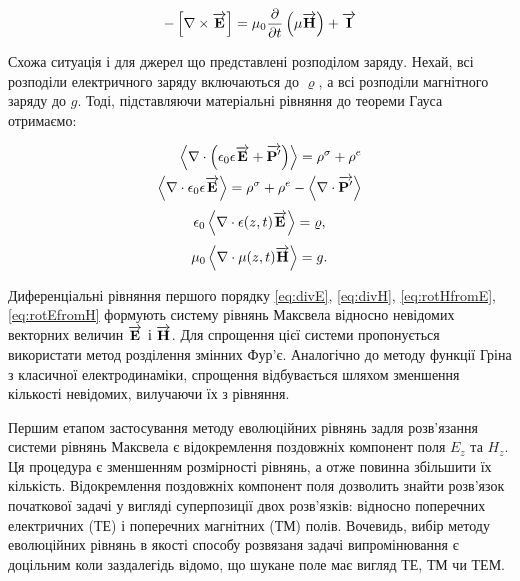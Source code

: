 \begin{equation} \label{eq:rotEfromH} 
- \left[ \nabla \times \overrightarrow{\mathbf E} \right] = 
\mu_0 \frac{\partial }{\partial t} \left( \mu \overrightarrow{\mathbf H} \right) + \overrightarrow{\mathbf I}
\end{equation}

Схожа ситуація і для джерел що представлені розподілом заряду. Нехай,
всі розподіли електричного заряду включаються до $ \varrho $, а всі розподіли 
магнітного заряду до $ g $. Тоді, підставляючи матеріальні рівняння до теореми 
Гауса отримаємо:

\textcolor{blue}{ \begin{equation*} \begin{aligned}
\left< \nabla \cdot  \left( \epsilon_0 \epsilon \overrightarrow{\mathbf E} + 
\overrightarrow{\mathbf P^\prime} \right)  \right> = \rho^\sigma + \rho^e \\
\left< \nabla \cdot  \epsilon_0 \epsilon \overrightarrow{\mathbf E}  \right> = \rho^\sigma + \rho^e -
\left< \nabla \cdot  \overrightarrow{\mathbf P^\prime}  \right>
\end{aligned} \end{equation*} }
%
\begin{equation} \label{eq:divE} 
\epsilon_0 \left< \nabla \cdot  \epsilon(z,t) \overrightarrow{\mathbf E}  \right> = \varrho,
\end{equation}
%
\begin{equation} \label{eq:divH}
\mu_0 \left< \nabla \cdot  \mu(z,t) \overrightarrow{\mathbf H}  \right> = g.
\end{equation}

Диференціальні рівняння першого порядку \eqref{eq:divE}, \eqref{eq:divH}, 
\eqref{eq:rotHfromE}, \eqref{eq:rotEfromH} формують систему 
рівнянь Максвела відносно невідомих векторних величин $ \overrightarrow{\mathbf E} $ і 
$ \overrightarrow{\mathbf H} $. Для спрощення цієї системи пропонується використати метод 
розділення змінних Фур'є. Аналогічно до методу функції Гріна з класичної 
електродинаміки, спрощення відбувається шляхом зменшення кількості невідомих,
вилучаючи їх з рівняння.

Першим етапом застосування методу еволюційних рівнянь задля розв'язання системи
рівнянь Максвела є відокремлення поздовжніх компонент поля $ E_z $ та $ H_z $.
Ця процедура є зменшенням розмірності рівнянь, а отже повинна збільшити їх 
кількість. Відокремлення поздовжніх компонент поля дозволить знайти розв'язок 
початкової задачі у вигляді суперпозиції двох розв'язків: відносно поперечних 
електричних (ТЕ) і поперечних магнітних (ТМ) полів. Вочевидь, вибір методу 
еволюційних рівнянь в якості способу розвязаня задачі випромінювання є 
доцільним коли заздалегідь відомо, що шукане поле має вигляд ТЕ, ТМ чи ТЕМ. 

